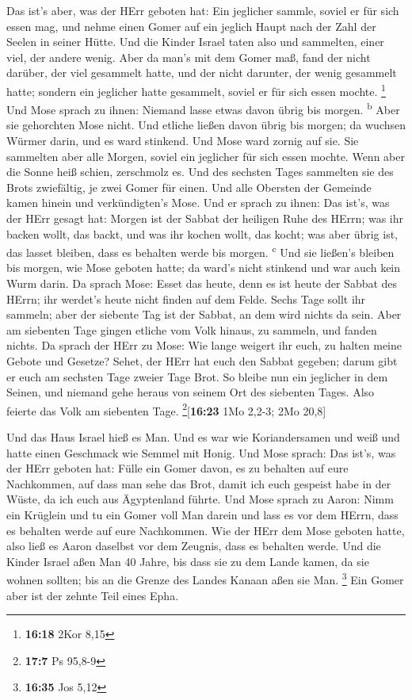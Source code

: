  Das ist's aber, was der HErr geboten hat: Ein jeglicher
sammle, soviel er für sich essen mag, und nehme einen Gomer auf ein
jeglich Haupt nach der Zahl der Seelen in seiner Hütte. 
Und die Kinder Israel taten also und sammelten, einer viel, der andere
wenig.  Aber da man's mit dem Gomer maß, fand der nicht
darüber, der viel gesammelt hatte, und der nicht darunter, der wenig
gesammelt hatte; sondern ein jeglicher hatte gesammelt, soviel er für
sich essen mochte. \footnote{\textbf{16:18} 2Kor 8,15} 
Und Mose sprach zu ihnen: Niemand lasse etwas davon übrig bis morgen.
\textsuperscript{b}  Aber sie gehorchten Mose nicht. Und
etliche ließen davon übrig bis morgen; da wuchsen Würmer darin, und es
ward stinkend. Und Mose ward zornig auf sie.  Sie
sammelten aber alle Morgen, soviel ein jeglicher für sich essen mochte.
Wenn aber die Sonne heiß schien, zerschmolz es.  Und des
sechsten Tages sammelten sie des Brots zwiefältig, je zwei Gomer für
einen. Und alle Obersten der Gemeinde kamen hinein und verkündigten's
Mose.  Und er sprach zu ihnen: Das ist's, was der HErr
gesagt hat: Morgen ist der Sabbat der heiligen Ruhe des HErrn; was ihr
backen wollt, das backt, und was ihr kochen wollt, das kocht; was aber
übrig ist, das lasset bleiben, dass es behalten werde bis morgen.
\textsuperscript{c}  Und sie ließen's bleiben bis morgen,
wie Mose geboten hatte; da ward's nicht stinkend und war auch kein Wurm
darin.  Da sprach Mose: Esset das heute, denn es ist
heute der Sabbat des HErrn; ihr werdet's heute nicht finden auf dem
Felde.  Sechs Tage sollt ihr sammeln; aber der siebente
Tag ist der Sabbat, an dem wird nichts da sein.  Aber am
siebenten Tage gingen etliche vom Volk hinaus, zu sammeln, und fanden
nichts.  Da sprach der HErr zu Mose: Wie lange weigert
ihr euch, zu halten meine Gebote und Gesetze?  Sehet, der
HErr hat euch den Sabbat gegeben; darum gibt er euch am sechsten Tage
zweier Tage Brot. So bleibe nun ein jeglicher in dem Seinen, und niemand
gehe heraus von seinem Ort des siebenten Tages.  Also
feierte das Volk am siebenten Tage. \footnote{\textbf{17:7} Ps 95,8-9}{[}\textbf{16:23}
1Mo 2,2-3; 2Mo 20,8{]}

 Und das Haus Israel hieß es Man. Und es war wie
Koriandersamen und weiß und hatte einen Geschmack wie Semmel mit Honig.
 Und Mose sprach: Das ist's, was der HErr geboten hat:
Fülle ein Gomer davon, es zu behalten auf eure Nachkommen, auf dass man
sehe das Brot, damit ich euch gespeist habe in der Wüste, da ich euch
aus Ägyptenland führte.  Und Mose sprach zu Aaron: Nimm
ein Krüglein und tu ein Gomer voll Man darein und lass es vor dem HErrn,
dass es behalten werde auf eure Nachkommen.  Wie der HErr
dem Mose geboten hatte, also ließ es Aaron daselbst vor dem Zeugnis,
dass es behalten werde.  Und die Kinder Israel aßen Man
40 Jahre, bis dass sie zu dem Lande kamen, da sie wohnen sollten; bis an
die Grenze des Landes Kanaan aßen sie Man. \footnote{\textbf{16:35} Jos
  5,12}  Ein Gomer aber ist der zehnte Teil eines Epha.

